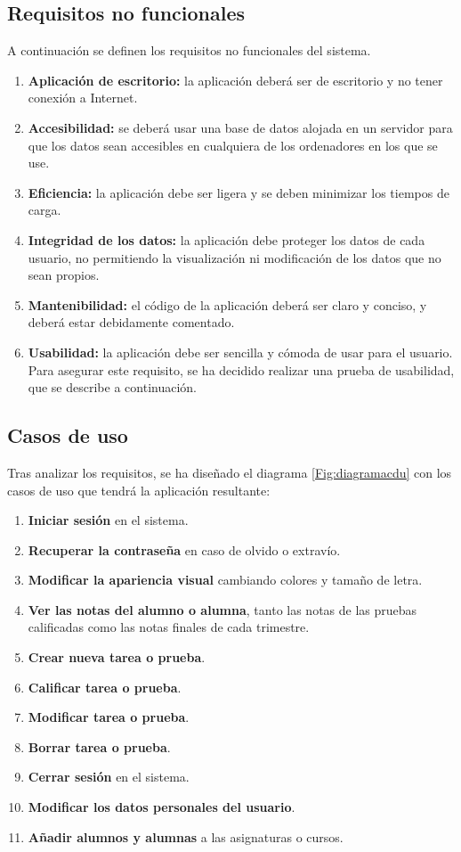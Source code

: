 \subsection{Requisitos no funcionales}
A continuación se definen los requisitos no funcionales del sistema.
\begin{enumerate}
	\item \textbf{Aplicación de escritorio:} la aplicación deberá ser de escritorio y no tener conexión a Internet.
	\item \textbf{Accesibilidad:} se deberá usar una base de datos alojada en un servidor para que los datos sean accesibles en cualquiera de los ordenadores en los que se use.
	\item \textbf{Eficiencia:} la aplicación debe ser ligera y se deben minimizar los tiempos de carga.
	\item \textbf{Integridad de los datos:} la aplicación debe proteger los datos de cada usuario, no permitiendo la visualización ni modificación de los datos que no sean propios.
	\item \textbf{Mantenibilidad:} el código de la aplicación deberá ser claro y conciso, y deberá estar debidamente comentado.
	\item \textbf{Usabilidad:} la aplicación debe ser sencilla y cómoda de usar para el usuario. Para asegurar este requisito, se ha decidido realizar una prueba de usabilidad, que se describe a continuación.
\end{enumerate}


\subsection{Casos de uso}
Tras analizar los requisitos, se ha diseñado el diagrama \ref{Fig:diagramacdu} con los casos de uso que tendrá la aplicación resultante:
\begin{enumerate}
	\item \textbf{Iniciar sesión} en el sistema.
	\item \textbf{Recuperar la contraseña} en caso de olvido o extravío.
	\item \textbf{Modificar la apariencia visual} cambiando colores y tamaño de letra.
	\item \textbf{Ver las notas del alumno o alumna}, tanto las notas de las pruebas calificadas como las notas finales de cada trimestre.
	\item \textbf{Crear nueva tarea o prueba}.
	\item \textbf{Calificar tarea o prueba}.
	\item \textbf{Modificar tarea o prueba}.
	\item \textbf{Borrar tarea o prueba}.
	\item \textbf{Cerrar sesión} en el sistema.
	\item \textbf{Modificar los datos personales del usuario}.
	\item \textbf{Añadir alumnos y alumnas} a las asignaturas o cursos.
\end{enumerate}

